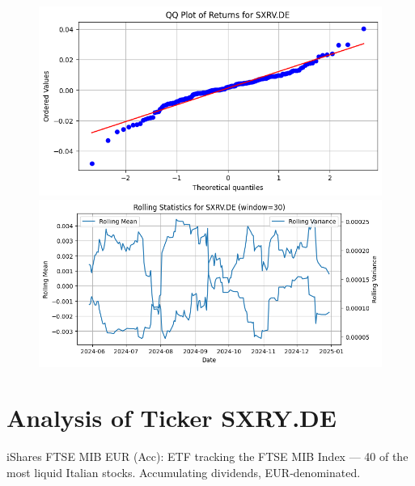 \documentclass{article}%
\begin{document}
%


\begin{figure}[htbp]%
\begin{minipage}{0.48\textwidth}%
\includegraphics[width=\linewidth]{ticker_images/SXRV.DE_qq_plot.png}%
\end{minipage}%
\begin{minipage}{0.48\textwidth}%
\includegraphics[width=\linewidth]{ticker_images/SXRV.DE_rolling_stats.png}%
\end{minipage}%
\end{figure}

%
\section*{Analysis of Ticker SXRY.DE}%
\label{sec:AnalysisofTickerSXRY.DE}%
iShares FTSE MIB EUR (Acc): ETF tracking the FTSE MIB Index — 40 of the most liquid Italian stocks. Accumulating dividends, EUR‑denominated.%
\end{document}
